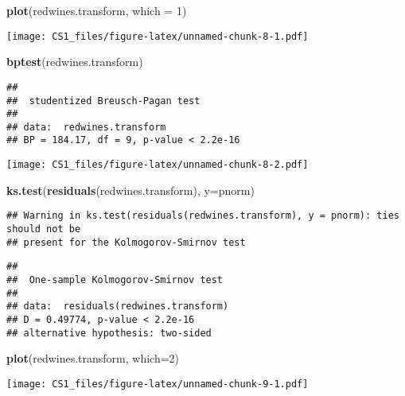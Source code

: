 \documentclass[
]{article}
\newenvironment{Shaded}{\begin{snugshade}}{\end{snugshade}}
\newcommand{\DataTypeTok}[1]{\textcolor[rgb]{0.13,0.29,0.53}{#1}}
\newcommand{\DecValTok}[1]{\textcolor[rgb]{0.00,0.00,0.81}{#1}}
\newcommand{\KeywordTok}[1]{\textcolor[rgb]{0.13,0.29,0.53}{\textbf{#1}}}
\newcommand{\NormalTok}[1]{#1}
\newcommand{\OperatorTok}[1]{\textcolor[rgb]{0.81,0.36,0.00}{\textbf{#1}}}
\begin{document}
\begin{Shaded}
\begin{Highlighting}[]
\KeywordTok{plot}\NormalTok{(redwines.transform, }\DataTypeTok{which =} \DecValTok{1}\NormalTok{)}
\end{Highlighting}
\end{Shaded}

\texttt{[image: CS1\_files/figure-latex/unnamed-chunk-8-1.pdf]}

\begin{Shaded}
\begin{Highlighting}[]
\KeywordTok{bptest}\NormalTok{(redwines.transform)}
\end{Highlighting}
\end{Shaded}

\begin{verbatim}
## 
##  studentized Breusch-Pagan test
## 
## data:  redwines.transform
## BP = 184.17, df = 9, p-value < 2.2e-16
\end{verbatim}

\begin{Shaded}
\end{Shaded}

\texttt{[image: CS1\_files/figure-latex/unnamed-chunk-8-2.pdf]}

\begin{Shaded}
\begin{Highlighting}[]
\KeywordTok{ks.test}\NormalTok{(}\KeywordTok{residuals}\NormalTok{(redwines.transform), }\DataTypeTok{y=}\NormalTok{pnorm)}
\end{Highlighting}
\end{Shaded}

\begin{verbatim}
## Warning in ks.test(residuals(redwines.transform), y = pnorm): ties should not be
## present for the Kolmogorov-Smirnov test
\end{verbatim}

\begin{verbatim}
## 
##  One-sample Kolmogorov-Smirnov test
## 
## data:  residuals(redwines.transform)
## D = 0.49774, p-value < 2.2e-16
## alternative hypothesis: two-sided
\end{verbatim}

\begin{Shaded}
\begin{Highlighting}[]
\KeywordTok{plot}\NormalTok{(redwines.transform, }\DataTypeTok{which=}\DecValTok{2}\NormalTok{)}
\end{Highlighting}
\end{Shaded}

\texttt{[image: CS1\_files/figure-latex/unnamed-chunk-9-1.pdf]}
\end{document}
